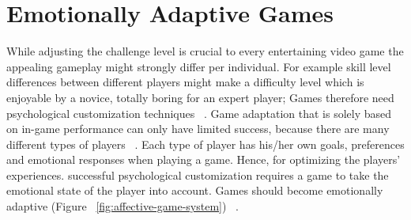 \section{Emotionally Adaptive Games}
While adjusting the challenge level is crucial to every entertaining video game the appealing gameplay might strongly differ per individual. For example skill level differences between different players might make a difficulty level which is enjoyable by a novice, totally boring for an expert player; Games therefore need psychological customization techniques ~\cite{saari2005towards}. Game adaptation that is solely based on in-game performance can only have limited success, because there are many different types of players ~\cite{bartle1996hearts}. Each type of player has his/her own goals, preferences and emotional responses when playing a game. Hence, for optimizing the players' experiences. successful psychological customization requires a game to take the emotional state of the player into account. Games should become emotionally adaptive (Figure ~\ref{fig:affective-game-system}) ~\cite{tijs2009creating}.


